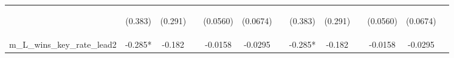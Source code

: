 \documentclass[]{article}
\begin{document}
\begin{center}
\begin{tabular}{lcccccccccccc}
\vspace{4pt} & \begin{footnotesize}(0.383)\end{footnotesize} & \begin{footnotesize}(0.291)\end{footnotesize} & \begin{footnotesize}\end{footnotesize} & \begin{footnotesize}(0.0560)\end{footnotesize} & \begin{footnotesize}(0.0674)\end{footnotesize} & \begin{footnotesize}\end{footnotesize} & \begin{footnotesize}(0.383)\end{footnotesize} & \begin{footnotesize}(0.291)\end{footnotesize} & \begin{footnotesize}\end{footnotesize} & \begin{footnotesize}(0.0560)\end{footnotesize} & \begin{footnotesize}(0.0674)\end{footnotesize} & \begin{footnotesize}\end{footnotesize} \\
m\_L\_wins\_key\_rate\_lead2 & -0.285* & -0.182 &  & -0.0158 & -0.0295 &  & -0.285* & -0.182 &  & -0.0158 & -0.0295 &  \\

\end{tabular}
\end{center}
\end{document}
